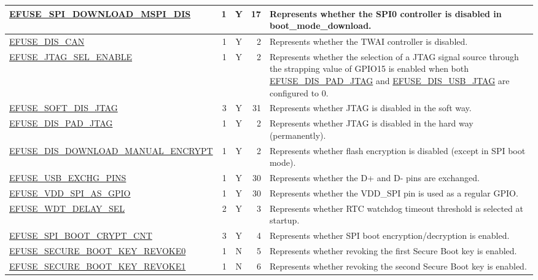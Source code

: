 \begin{longtable}[l]{ |m{8.2cm}|r|c|r|m{9cm}| }
    \hline
    \hyperref[fielddesc:EFUSESPIDOWNLOADMSPIDIS]{EFUSE\_SPI\_DOWNLOAD\_MSPI\_DIS} & 1 & Y & 17 & Represents whether the SPI0 controller is disabled in boot\_mode\_download. \\
    \hline
    \hyperref[fielddesc:EFUSEDISCAN]{EFUSE\_DIS\_CAN} & 1 & Y & 2 & Represents whether the TWAI controller is disabled. \\
    \hline
    \hyperref[fielddesc:EFUSEJTAGSELENABLE]{EFUSE\_JTAG\_SEL\_ENABLE} & 1 & Y & 2 & Represents whether the selection of a JTAG signal source through the strapping value of GPIO15 is enabled when both \hyperref[fielddesc:EFUSEDISPADJTAG]{EFUSE\_DIS\_PAD\_JTAG} and \hyperref[fielddesc:EFUSEDISUSBJTAG]{EFUSE\_DIS\_USB\_JTAG} are configured to 0.\\
    \hline
    \hyperref[fielddesc:EFUSESOFTDISJTAG]{EFUSE\_SOFT\_DIS\_JTAG} & 3 & Y & 31 & Represents whether JTAG is disabled in the soft way.\\
    \hline
    \hyperref[fielddesc:EFUSEDISPADJTAG]{EFUSE\_DIS\_PAD\_JTAG} & 1 & Y & 2 & Represents whether JTAG is disabled in the hard way (permanently). \\
    \hline
    \hyperref[fielddesc:EFUSEDISDOWNLOADMANUALENCRYPT]{EFUSE\_DIS\_DOWNLOAD\_MANUAL\_ENCRYPT} &  1 & Y & 2 & Represents whether flash encryption is disabled (except in SPI boot mode).\\
    \hline
    \hyperref[fielddesc:EFUSEUSBEXCHGPINS]{EFUSE\_USB\_EXCHG\_PINS} & 1 & Y & 30 & Represents whether the D+ and D- pins are exchanged. \\
    \hline
    \hyperref[fielddesc:EFUSEVDDSPIASGPIO]{EFUSE\_VDD\_SPI\_AS\_GPIO} & 1 & Y & 30 & Represents whether the VDD\_SPI pin is used as a regular GPIO. \\
    \hline
    \hyperref[fielddesc:EFUSEWDTDELAYSEL]{EFUSE\_WDT\_DELAY\_SEL} & 2 & Y & 3 & Represents whether RTC watchdog timeout threshold is selected at startup.\\
    \hline
    \hyperref[fielddesc:EFUSESPIBOOTCRYPTCNT]{EFUSE\_SPI\_BOOT\_CRYPT\_CNT} & 3 & Y & 4 & Represents whether SPI boot encryption/decryption is enabled.\\
    \hline
    \hyperref[fielddesc:EFUSESECUREBOOTKEYREVOKE0]{EFUSE\_SECURE\_BOOT\_KEY\_REVOKE0} & 1 & N & 5 & Represents whether revoking the first Secure Boot key is enabled.\\
    \hline
    \hyperref[fielddesc:EFUSESECUREBOOTKEYREVOKE1]{EFUSE\_SECURE\_BOOT\_KEY\_REVOKE1} & 1 & N & 6 & Represents whether revoking the second Secure Boot key is enabled.\\

\end{longtable}
